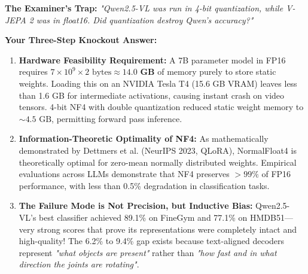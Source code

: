 \documentclass[a4paper, 11pt]{article}
\begin{document}
\begin{trapbox}
\textbf{The Examiner's Trap:} \textit{"Qwen2.5-VL was run in 4-bit quantization, while V-JEPA 2 was in float16. Did quantization destroy Qwen's accuracy?"}

\textbf{Your Three-Step Knockout Answer:}
\begin{enumerate}
    \item \textbf{Hardware Feasibility Requirement:} A 7B parameter model in FP16 requires $7 \times 10^9 \times 2\text{ bytes} \approx \mathbf{14.0\text{ GB}}$ of memory purely to store static weights. Loading this on an NVIDIA Tesla T4 (15.6 GB VRAM) leaves less than 1.6 GB for intermediate activations, causing instant crash on video tensors. 4-bit NF4 with double quantization reduced static weight memory to $\sim 4.5\text{ GB}$, permitting forward pass inference.
    \item \textbf{Information-Theoretic Optimality of NF4:} As mathematically demonstrated by Dettmers et al. (NeurIPS 2023, QLoRA), NormalFloat4 is theoretically optimal for zero-mean normally distributed weights. Empirical evaluations across LLMs demonstrate that NF4 preserves $>99\%$ of FP16 performance, with less than 0.5\% degradation in classification tasks.
    \item \textbf{The Failure Mode is Not Precision, but Inductive Bias:} Qwen2.5-VL's best classifier achieved 89.1\% on FineGym and 77.1\% on HMDB51—very strong scores that prove its representations were completely intact and high-quality! The 6.2\% to 9.4\% gap exists because text-aligned decoders represent \textit{"what objects are present"} rather than \textit{"how fast and in what direction the joints are rotating"}.
\end{enumerate}
\end{trapbox}
\end{document}
